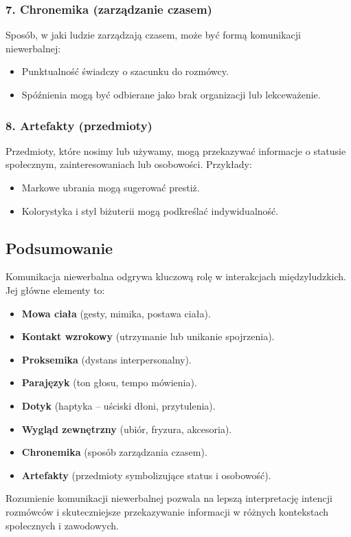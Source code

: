 \subsubsection{7. Chronemika (zarządzanie czasem)}
Sposób, w jaki ludzie zarządzają czasem, może być formą komunikacji niewerbalnej:
\begin{itemize}
    \item Punktualność świadczy o szacunku do rozmówcy.
    \item Spóźnienia mogą być odbierane jako brak organizacji lub lekceważenie.
\end{itemize}

\subsubsection{8. Artefakty (przedmioty)}
Przedmioty, które nosimy lub używamy, mogą przekazywać informacje o statusie społecznym, zainteresowaniach lub osobowości. Przykłady:
\begin{itemize}
    \item Markowe ubrania mogą sugerować prestiż.
    \item Kolorystyka i styl biżuterii mogą podkreślać indywidualność.
\end{itemize}

\subsection{Podsumowanie}
Komunikacja niewerbalna odgrywa kluczową rolę w interakcjach międzyludzkich. Jej główne elementy to:
\begin{itemize}
    \item \textbf{Mowa ciała} (gesty, mimika, postawa ciała).
    \item \textbf{Kontakt wzrokowy} (utrzymanie lub unikanie spojrzenia).
    \item \textbf{Proksemika} (dystans interpersonalny).
    \item \textbf{Parajęzyk} (ton głosu, tempo mówienia).
    \item \textbf{Dotyk} (haptyka – uściski dłoni, przytulenia).
    \item \textbf{Wygląd zewnętrzny} (ubiór, fryzura, akcesoria).
    \item \textbf{Chronemika} (sposób zarządzania czasem).
    \item \textbf{Artefakty} (przedmioty symbolizujące status i osobowość).
\end{itemize}

Rozumienie komunikacji niewerbalnej pozwala na lepszą interpretację intencji rozmówców i skuteczniejsze przekazywanie informacji w różnych kontekstach społecznych i zawodowych.

